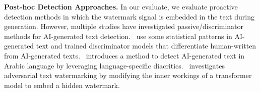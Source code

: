 \noindent\textbf{Post-hoc Detection Approaches.}
In our evaluate, we evaluate proactive detection methods in which the watermark signal is embedded in the text during generation. However, 
multiple studies have investigated passive/discriminator methods for AI-generated text detection.~\citet{tian_gptzero_2023,mitchell_detectgpt_2023,gehrmann2019gltr} use some statistical patterns in AI-generated text and trained discriminator models that differentiate human-written from AI-generated texts.~\citet{alshammari2024toward} introduces a method to detect AI-generated text in Arabic language by leveraging language-specific diacritics.~\citet{abdelnabi2021adversarial} investigates adversarial text watermarking by modifying the inner workings of a transformer model to embed a hidden watermark.